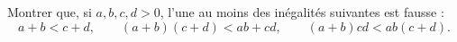 Montrer que, si $a, b, c, d > 0$, l'une au moins des inégalités suivantes est fausse :
\[ a + b < c + d,\qquad (a + b)(c + d) < ab + cd,\qquad (a + b)cd < ab(c + d). \]
